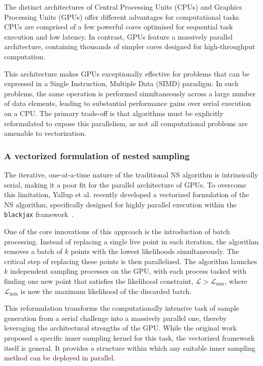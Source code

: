 \documentclass[fleqn,usenatbib]{mnras}
\begin{document}
The distinct architectures of Central Processing Units (CPUs) and
Graphics Processing Units (GPUs) offer different advantages for
computational tasks. CPUs are comprised of a few powerful cores
optimised for sequential task execution and low latency. In contrast,
GPUs feature a massively parallel architecture, containing thousands of
simpler cores designed for high-throughput computation.

This architecture makes GPUs exceptionally effective for problems that can
be expressed in a Single Instruction, Multiple Data (SIMD) paradigm.
In such problems, the same operation is performed simultaneously across
a large number of data elements, leading to substantial performance
gains over serial execution on a CPU. The primary trade-off is that
algorithms must be explicitly reformulated to expose this parallelism,
as not all computational problems are amenable to vectorization.

\subsubsection{A vectorized formulation of nested sampling}
\label{sec:background_vectorized_ns}

The iterative, one-at-a-time nature of the traditional NS algorithm
is intrinsically serial, making it a poor fit for the parallel
architecture of GPUs. To overcome this limitation, Yallup et al.
recently developed a vectorized formulation of the NS algorithm,
specifically designed for highly parallel execution within the
\texttt{blackjax} framework~\citep{yallup2025nested, cabezas2024blackjax}.

One of the core innovations of this approach is the introduction of batch
processing. Instead of replacing a single live point in each iteration,
the algorithm removes a batch of $k$ points with the lowest likelihoods
simultaneously. The critical step of replacing these points is then
parallelized. The algorithm launches $k$ independent sampling processes
on the GPU, with each process tasked with finding one new point that
satisfies the likelihood constraint, $\mathcal{L} > \mathcal{L}_{\text{min}}$,
where $\mathcal{L}_{\text{min}}$ is now the maximum likelihood of the
discarded batch.

This reformulation transforms the computationally intensive task of
sample generation from a serial challenge into a massively parallel one,
thereby leveraging the architectural strengths of the GPU. While the
original work proposed a specific inner sampling kernel for this task,
the vectorized framework itself is general. It provides a structure
within which any suitable inner sampling method can be deployed in
parallel.
\end{document}
